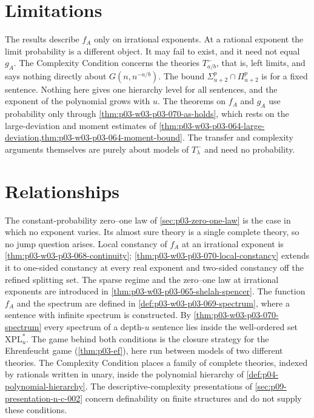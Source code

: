 \section{Limitations}
\label{sec:p03-w03-p03-070-limitations}

The results describe \(f_A\) only on irrational exponents.  At a rational
exponent the limit probability is a different object.  It may fail to exist,
and it need not equal \(g_A\).  The Complexity Condition concerns the
theories \(T^-_{a/b}\), that is, left limits, and says nothing directly about
\(G(n,n^{-a/b})\).  The bound \(\Sigma^p_{u+2}\cap\Pi^p_{u+2}\) is for a fixed sentence.
Nothing here gives one hierarchy level for all sentences, and the exponent of
the polynomial grows with \(u\).  The theorems on \(f_A\) and \(g_A\) use
probability only through \cref{thm:p03-w03-p03-070-as-holds}, which rests on
the large-deviation and moment estimates of
\cref{thm:p03-w03-p03-064-large-deviation,thm:p03-w03-p03-064-moment-bound}.
The transfer and complexity arguments themselves are purely about models of
\(T^-_\lambda\) and need no probability.

\section{Relationships}
\label{sec:p03-w03-p03-070-relationships}

The constant-probability zero--one law of \cref{sec:p03-zero-one-law} is the
case in which no exponent varies.  Its almost sure theory is a single
complete theory, so no jump question arises.  Local constancy of \(f_A\) at
an irrational exponent is \cref{thm:p03-w03-p03-068-continuity};
\cref{thm:p03-w03-p03-070-local-constancy} extends it to one-sided
constancy at every real exponent and two-sided constancy off the refined
splitting set.  The sparse regime and the
zero--one law at irrational exponents are introduced in
\cref{thm:p03-w03-p03-065-shelah-spencer}.  The function \(f_A\) and the
spectrum are defined in \cref{def:p03-w03-p03-069-spectrum}, where a sentence
with infinite spectrum is constructed.  By
\cref{thm:p03-w03-p03-070-spectrum} every spectrum of a depth-\(u\) sentence
lies inside the well-ordered set \(\mathrm{XPL}^\ast_u\).  The game behind
both conditions is the closure strategy for the Ehrenfeucht game
(\cref{thm:p03-ef}), here run between models of two different theories.  The
Complexity Condition places a family of complete theories, indexed by
rationals written in unary, inside the polynomial hierarchy of
\cref{def:p04-polynomial-hierarchy}.  The descriptive-complexity
presentations of \cref{sec:p09-presentation-n-c-002} concern definability on
finite structures and do not supply these conditions.

